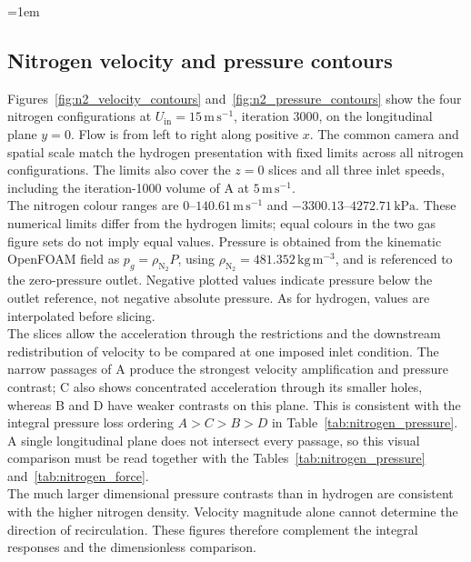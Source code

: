 \begingroup\emergencystretch=1em
\subsection{Nitrogen velocity and pressure contours}
\label{sec:nitrogen_contours}

Figures~\ref{fig:n2_velocity_contours} and~\ref{fig:n2_pressure_contours} show the four nitrogen configurations at $U_{\mathrm{in}}=15\,\mathrm{m\,s^{-1}}$, iteration 3000, on the longitudinal plane $y=0$. Flow is from left to right along positive $x$. The common camera and spatial scale match the hydrogen presentation with fixed limits across all nitrogen configurations. The limits also cover the $z=0$ slices and all three inlet speeds, including the iteration-1000 volume of A at $5\,\mathrm{m\,s^{-1}}$.\\

The nitrogen colour ranges are $0$--$140.61\,\mathrm{m\,s^{-1}}$ and $-3300.13$--$4272.71\,\mathrm{kPa}$. These numerical limits differ from the hydrogen limits; equal colours in the two gas figure sets do not imply equal values. Pressure is obtained from the kinematic OpenFOAM field as $p_g=\rho_{\mathrm{N}_2}P$, using $\rho_{\mathrm{N}_2}=481.352\,\mathrm{kg\,m^{-3}}$, and is referenced to the zero-pressure outlet. Negative plotted values indicate pressure below the outlet reference, not negative absolute pressure. As for hydrogen, values are interpolated before slicing.\\

The slices allow the acceleration through the restrictions and the downstream redistribution of velocity to be compared at one imposed inlet condition. The narrow passages of A produce the strongest velocity amplification and pressure contrast; C also shows concentrated acceleration through its smaller holes, whereas B and D have weaker contrasts on this plane. This is consistent with the integral pressure loss ordering $A>C>B>D$ in Table~\ref{tab:nitrogen_pressure}. A single longitudinal plane does not intersect every passage, so this visual comparison must be read together with the Tables~\ref{tab:nitrogen_pressure} and~\ref{tab:nitrogen_force}.\\

The much larger dimensional pressure contrasts than in hydrogen are consistent with the higher nitrogen density. Velocity magnitude alone cannot determine the direction of recirculation. These figures therefore complement the integral responses and the dimensionless comparison.

